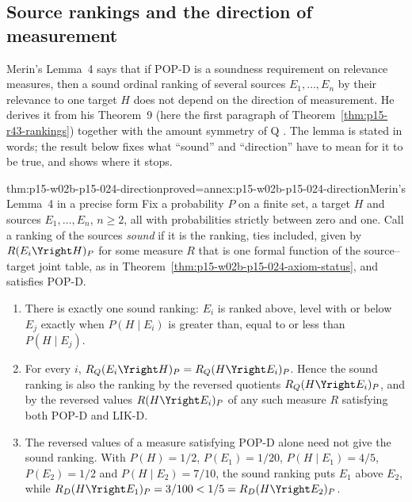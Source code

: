 \subsection{Source rankings and the direction of measurement}
\label{sec:p15-w02b-p15-024-direction}

Merin's Lemma~4 says that if POP-D is a soundness requirement on
relevance measures, then a sound ordinal ranking of several sources
\(E_1,\ldots,E_n\) by their relevance to one target \(H\) does not
depend on the direction of measurement. He derives it from his
Theorem~9 (here the first paragraph of
Theorem~\ref{thm:p15-r43-rankings}) together with the amount symmetry
of Q \cite[p.~271]{Merin2021Relevance}. The lemma is stated in words;
the result below fixes what ``sound'' and ``direction'' have to mean
for it to be true, and shows where it stops.

\begin{hbtheorem}{thm:p15-w02b-p15-024-direction}{proved=annex:p15-w02b-p15-024-direction}{Merin's Lemma~4 in a precise form}
Fix a probability \(P\) on a finite set, a target \(H\) and sources
\(E_1,\ldots,E_n\), \(n\geq2\), all with probabilities strictly between
zero and one. Call a ranking of the sources \emph{sound} if it is the
ranking, ties included, given by \(R(E_i\Yright H)_P\) for some
measure \(R\) that is one formal function of the source--target joint
table, as in Theorem~\ref{thm:p15-w02b-p15-024-axiom-status}, and
satisfies POP-D.
\begin{enumerate}
\item There is exactly one sound ranking: \(E_i\) is ranked above,
  level with or below \(E_j\) exactly when \(P(H\mid E_i)\) is
  greater than, equal to or less than \(P(H\mid E_j)\).
\item For every \(i\),
  \(R_Q(E_i\Yright H)_P=R_Q(H\Yright E_i)_P\). Hence the sound ranking
  is also the ranking by the reversed quotients \(R_Q(H\Yright E_i)_P\),
  and by the reversed values \(R(H\Yright E_i)_P\) of any such measure
  \(R\) satisfying both POP-D and LIK-D.
\item The reversed values of a measure satisfying POP-D alone need not
  give the sound ranking. With \(P(H)=1/2\), \(P(E_1)=1/20\),
  \(P(H\mid E_1)=4/5\), \(P(E_2)=1/2\) and \(P(H\mid E_2)=7/10\),
  the sound ranking puts \(E_1\) above \(E_2\), while
  \(R_D(H\Yright E_1)_P=3/100<1/5=R_D(H\Yright E_2)_P\).
\end{enumerate}
\end{hbtheorem}

